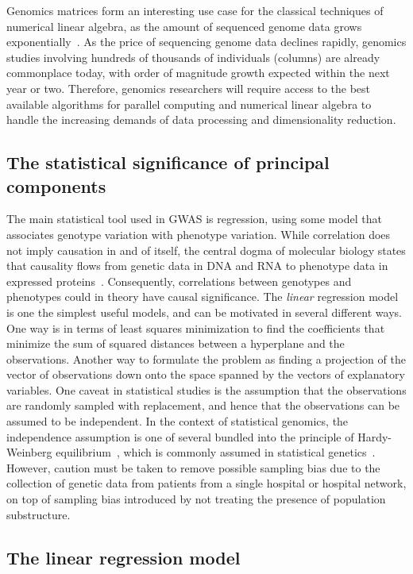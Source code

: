 \documentclass[review]{siamart0516}
\begin{document}
Genomics matrices form an interesting use case for the classical techniques of
numerical linear algebra, as the amount of sequenced genome data grows
exponentially~\cite{Stephens2015}. As the price of sequencing genome data declines
rapidly, genomics studies involving hundreds of thousands of individuals (columns)
are already commonplace today, with order of magnitude growth expected within the next year or two. Therefore, genomics researchers will require access to the best
available algorithms for parallel computing and numerical linear algebra to
handle the increasing demands of data processing and dimensionality reduction.


\subsection{The statistical significance of principal components}

The main statistical tool used in GWAS is regression, using some model that
associates genotype variation with phenotype variation.
While correlation does not imply causation in and of itself, the central dogma
of molecular biology states that causality flows from genetic data in DNA and RNA
to phenotype data in expressed proteins~\cite{Crick1970}. Consequently, correlations between genotypes and phenotypes could in theory have causal significance.
The \emph{linear} regression model is one the simplest useful models, and can be
motivated in several different ways. One way is in terms of least squares
minimization to find the coefficients that minimize the sum of squared distances
between a hyperplane and the observations. Another way to formulate the problem
as finding a projection of the vector of observations down onto the space
spanned by the vectors of explanatory variables.
One caveat in statistical studies is the assumption that the observations are
randomly sampled with replacement, and hence that the observations can be
assumed to be independent. In the context of statistical genomics, the
independence assumption is one of several bundled into the principle of
Hardy-Weinberg equilibrium~\cite{Hardy1908,Weinberg1908}, which is commonly
assumed in statistical genetics~\cite{Laird2011}. However, caution must be taken
to remove possible sampling bias due to the collection of genetic data from
patients from a single hospital or hospital network, on top of sampling bias
introduced by not treating the presence of population substructure.


\subsection{The linear regression model}
\end{document}
